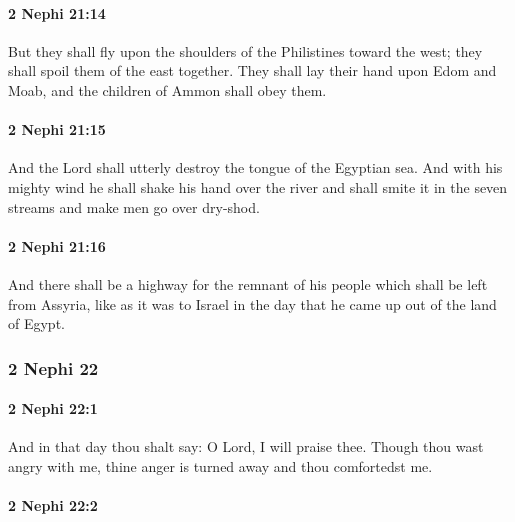 		\paragraph{2 Nephi 21:14} %
			\label{2NEPHI-21-14}

			But they shall fly upon the shoulders of the Philistines toward the west;
			they shall spoil them of the east together.
			They shall lay their hand upon Edom and Moab,
			and the children of Ammon shall obey them.

		\paragraph{2 Nephi 21:15} %
			\label{2NEPHI-21-15}

			And the Lord shall utterly destroy the tongue of the Egyptian sea.
			And with his mighty wind he shall shake his hand over the river
			and shall smite it in the seven streams
			and make men go over dry-shod.

		\paragraph{2 Nephi 21:16} %
			\label{2NEPHI-21-16}

			And there shall be a highway for the remnant of his people
			which shall be left from Assyria,
			like as it was to Israel in the day that he came up out of the land of Egypt.

	\subsubsection{2 Nephi 22} %
		\label{2NEPHI-22}
		
		\paragraph{2 Nephi 22:1} %
			\label{2NEPHI-22-1}

			And in that day thou shalt say:
			O Lord, I will praise thee.
			Though thou wast angry with me,
			thine anger is turned away and thou comfortedst me.

		\paragraph{2 Nephi 22:2} %
			\label{2NEPHI-22-2}

